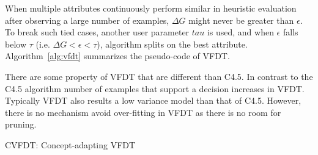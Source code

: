 When multiple attributes continuously perform similar in heuristic evaluation after observing a large number of examples, $\Delta G$ might never be greater than $\epsilon$. To break such tied cases, another user parameter $tau$ is used, and when $\epsilon$ falls below $\tau$ (i.e. $\Delta G < \epsilon <\tau$), algorithm splits on the best attribute. Algorithm~\ref{alg:vfdt} summarizes the pseudo-code of VFDT.

There are some property of VFDT that are different than C4.5. In contrast to the C4.5 algorithm number of examples that support a decision increases in VFDT. Typically VFDT also results a low variance model than that of C4.5. However, there is no mechanism avoid over-fitting in VFDT as there is no room for pruning.

\begin{algorithm}[htbp]
    \DontPrintSemicolon
      
    \caption{CVFDT: Concept-adapting VFDT}
    \label{alg:cvfdt}
    
    
\end{algorithm}
